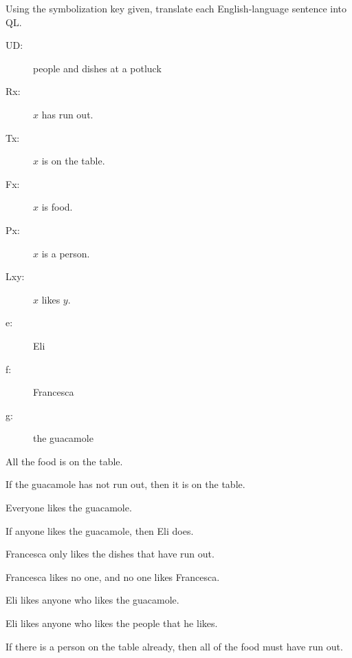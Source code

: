 \problempart
Using the symbolization key given, translate each English-language sentence into QL.
\begin{description}
\item[UD:] people and dishes at a potluck
\item[Rx:] $x$ has run out.
\item[Tx:] $x$ is on the table.
\item[Fx:] $x$ is food.
\item[Px:] $x$ is a person.
\item[Lxy:] $x$ likes $y$.
\item[e:] Eli
\item[f:] Francesca
\item[g:] the guacamole
\end{description}
\begin{kormanize}
\item All the food is on the table.
\item If the guacamole has not run out, then it is on the table.
\item Everyone likes the guacamole.
\item If anyone likes the guacamole, then Eli does.
\item Francesca only likes the dishes that have run out.
\item Francesca likes no one, and no one likes Francesca.
\item Eli likes anyone who likes the guacamole.
\item Eli likes anyone who likes the people that he likes.
\item If there is a person on the table already, then all of the food must have run out.
\end{kormanize}



